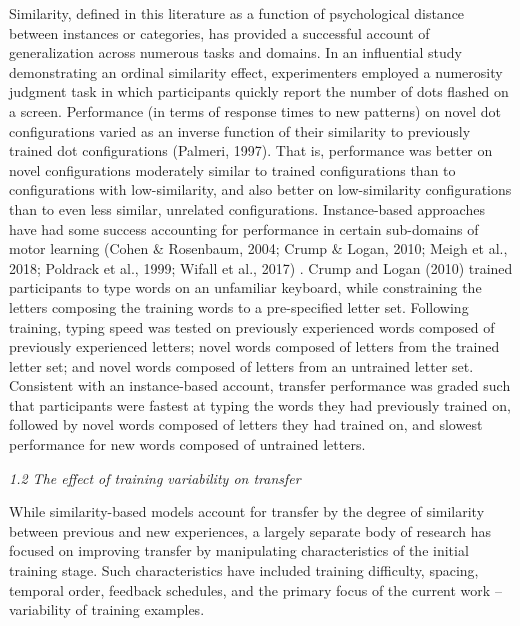 \documentclass[
  jou, donotrepeattitle,floatsintext]{apa7}
\begin{document}
Similarity, defined in this literature as a function of psychological distance between instances or categories, has provided a successful account of generalization across numerous tasks and domains. In an influential study demonstrating an ordinal similarity effect, experimenters employed a numerosity judgment task in which participants quickly report the number of dots flashed on a screen. Performance (in terms of response times to new patterns) on novel dot configurations varied as an inverse function of their similarity to previously trained dot configurations (Palmeri, 1997). That is, performance was better on novel configurations moderately similar to trained configurations than to configurations with low-similarity, and also better on low-similarity configurations than to even less similar, unrelated configurations. Instance-based approaches have had some success accounting for performance in certain sub-domains of motor learning (Cohen \& Rosenbaum, 2004; Crump \& Logan, 2010; Meigh et al., 2018; Poldrack et al., 1999; Wifall et al., 2017) . Crump and Logan (2010) trained participants to type words on an unfamiliar keyboard, while constraining the letters composing the training words to a pre-specified letter set. Following training, typing speed was tested on previously experienced words composed of previously experienced letters; novel words composed of letters from the trained letter set; and novel words composed of letters from an untrained letter set. Consistent with an instance-based account, transfer performance was graded such that participants were fastest at typing the words they had previously trained on, followed by novel words composed of letters they had trained on, and slowest performance for new words composed of untrained letters.

\emph{1.2 The effect of training variability on transfer}

While similarity-based models account for transfer by the degree of similarity between previous and new experiences, a largely separate body of research has focused on improving transfer by manipulating characteristics of the initial training stage. Such characteristics have included training difficulty, spacing, temporal order, feedback schedules, and the primary focus of the current work -- variability of training examples.
\end{document}
